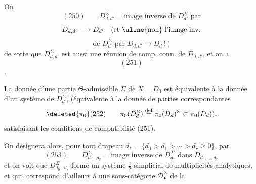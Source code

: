 On  
\[
(250)\qquad D_{d,d'}^\Sigma=\text{image inverse de }D_{d'}^\Sigma\text{ par}
\]
\[
D_{d,d'}\longrightarrow D_{d'}\quad\text{(et \uline{non} l'image inv.}
\]
\[
\text{de }D_d^\Sigma\text{ par }D_{d,d'}\longrightarrow D_d\ !\ )
\]
de sorte que \uline{$D_{d,d'}^\Sigma$} est aussi une réunion de comp. conn. de $D_{d,d'}$, et on a
\[
(251)
\]
.

La donnée d'une partie $\Theta$-admissible $\Sigma$ de $X=D_0$ est équivalente à la donnée d'un système de $D_d^\Sigma$, (équivalente à la donnée de parties correspondantes
\[
\deleted{\pi_0}(252)\qquad
\pi_0(D_d^\Sigma)\overset{\mathrm{def}}=\pi_0(D_d)^\Sigma\subset\pi_0(D_d)),
\]
satisfaisant les conditions de compatibilité (251).

On désignera alors, pour tout drapeau $d_*=\{d_0>d_1>\cdots>d_r\geq0\}$, par
\[
(253)\qquad D_{d_0\ldots d_r}^\Sigma=\text{image inverse de }D_{d_r}^\Sigma
\text{ dans }D_{d_0,\ldots,d_r}
\]
et on voit que  $D_{d_0\ldots d_r}^\Sigma$ forme un système $\frac12$ simplicial de  multiplicités analytiques, et qui,  correspond d'ailleurs à une sous-catégorie $\mathcal D_\bullet^\Sigma$ de la
